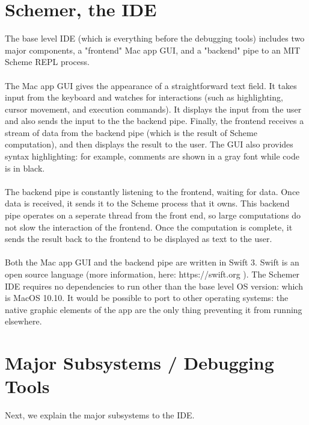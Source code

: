 \documentclass[10pt,journal,compsoc]{IEEEtran}
\begin{document}
		\section{Schemer, the IDE}
		The base level IDE (which is everything before the debugging tools) includes two major components, a "frontend" Mac app GUI, and a "backend" pipe to an MIT Scheme REPL process.\\
		\\
		The Mac app GUI gives the appearance of a straightforward text field. It takes input from the keyboard and watches for interactions (such as highlighting, cursor movement, and execution commands). It displays the input from the user and also sends the input to the the backend pipe. Finally, the frontend receives a stream of data from the backend pipe (which is the result of Scheme computation), and then displays the result to the user. The GUI also provides syntax highlighting: for example, comments are shown in a gray font while code is in black.\\
		\\
		The backend pipe is constantly listening to the frontend, waiting for data. Once data is received, it sends it to the Scheme process that it owns. This backend pipe operates on a seperate thread from the front end, so large computations do not slow the interaction of the frontend. Once the computation is complete, it sends the result back to the frontend to be displayed as text to the user.\\
		\\
		Both the Mac app GUI and the backend pipe are written in Swift 3. Swift is an open source language (more information, here: https://swift.org ). The Schemer IDE requires no dependencies to run other than the base level OS version: which is MacOS 10.10. It would be possible to port to other operating systems: the native graphic elements of the app are the only thing preventing it from running elsewhere.
		
		\section{Major Subsystems / Debugging Tools}
		
		Next, we explain the major subsystems to the IDE.
	    
\end{document}
